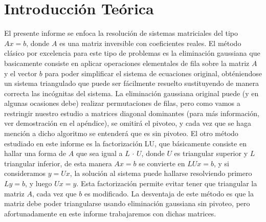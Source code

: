 \section{Introducción Teórica}
%
El presente informe se enfoca la resolución de sistemas matriciales del tipo $Ax=b$, donde $A$ es una matriz inversible con coeficientes reales. El método clásico por excelencia para este tipo de problemas es la eliminación gaussiana que basicamente consiste en aplicar operaciones elementales de fila sobre la matriz $A$ y el vector $b$ para poder simplificar el sistema de ecuaciones original, obténiendose un sistema triangulado que puede ser fácilmente resuelto sustituyendo de manera correcta las incógnitas del sistema. La eliminación gaussiana original puede (y en algunas ocasiones debe) realizar permutaciones de filas, pero como vamos a restringir nuestro estudio a matrices diagonal dominantes (para más información, ver demostración en el apéndice), se omitirá el pivoteo, y cada vez que se haga mención a dicho algoritmo se entenderá que es sin pivoteo.
El otro método estudiado en este informe es la factorización LU, que básicamente consiste en hallar una forma de $A$ que sea igual a $L$ $\cdot$ $U$, donde $U$ es triangular superior y $L$ triangular inferior, de esta manera $Ax=b$ se convierte en $LUx=b$, y si consideramos $y=Ux$, la solución al sistema puede hallarse resolviendo primero $Ly=b$, y luego $Ux=y$. Esta factorización permite evitar tener que triangular la matriz $A$, cada vez que $b$ es modificado. La desventaja de este método es que la matriz debe poder triangularse usando eliminación gaussiana sin pivoteo, pero afortunadamente en este informe trabajaremos con dichas matrices.
